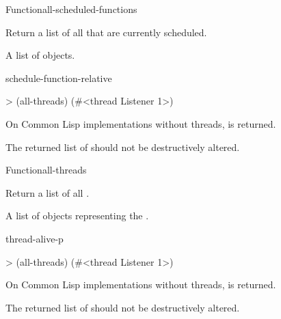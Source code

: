 \documentclass[10pt,twoside,english,pdftex]{article}
\begin{document}
\begin{functiondoc}{Function}{all-scheduled-functions}{\noargs{} 
    \returns{} }
%
%

\fnsyntax

\fnpurpose Return a list of all  that are
currently scheduled.

\fnpackage {}

\fnmodule {}

\fnreturns A list of  objects. 

\begin{alsos}{schedule-function-relative}
\end{alsos}

\fnexample
\begin{example}
> (all-threads)
(#<thread Listener 1>)
\end{example}

\fnnotes On Common Lisp implementations without threads, \nil{} is returned.

The returned list of  should not be
destructively altered.

\end{functiondoc}


\begin{functiondoc}{Function}{all-threads}{\noargs{} 
    \returns{} }
%

\fnsyntax

\fnpurpose Return a list of all .

\fnpackage {}

\fnmodule {}

\fnreturns A list of objects representing the . 

\begin{alsos}{thread-alive-p}
\also[threadp]
\end{alsos}

\fnexample
\begin{example}
> (all-threads)
(#<thread Listener 1>)
\end{example}

\fnnotes On Common Lisp implementations without threads, \nil{} is returned.

The returned list of  should not be destructively
altered.

\end{functiondoc}
\end{document}
